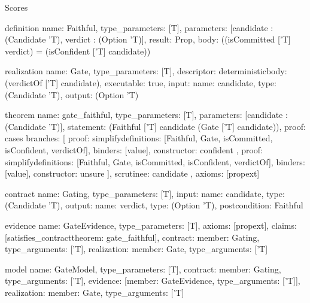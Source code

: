 \begin{lexlean}{Scores}
\begin{semanticmodule}
definition{
  name: Faithful,
  type_parameters: [T],
  parameters: [candidate : (Candidate 'T), verdict : (Option 'T)],
  result: Prop,
  body: ((isCommitted ['T] verdict) = (isConfident ['T] candidate))
}

realization{
  name: Gate,
  type_parameters: [T],
  descriptor: deterministic{body: (verdictOf ['T] candidate)},
  executable: true,
  input: {name: candidate, type: (Candidate 'T)},
  output: (Option 'T)
}

theorem{
  name: gate_faithful,
  type_parameters: [T],
  parameters: [candidate : (Candidate 'T)],
  statement: (Faithful ['T] candidate (Gate ['T] candidate)),
  proof: cases{
    branches: [
      {
        proof: simplify{definitions: [Faithful, Gate, isCommitted, isConfident, verdictOf]},
        binders: [value],
        constructor: confident
      },
      {
        proof: simplify{definitions: [Faithful, Gate, isCommitted, isConfident, verdictOf]},
        binders: [value],
        constructor: unsure
      }
    ],
    scrutinee: candidate
  },
  axioms: [propext]
}

contract{
  name: Gating,
  type_parameters: [T],
  input: {name: candidate, type: (Candidate 'T)},
  output: {name: verdict, type: (Option 'T)},
  postcondition: Faithful
}

evidence{
  name: GateEvidence,
  type_parameters: [T],
  axioms: [propext],
  claims: [satisfies_contract{theorem: gate_faithful}],
  contract: {member: Gating, type_arguments: ['T]},
  realization: {member: Gate, type_arguments: ['T]}
}

model{
  name: GateModel,
  type_parameters: [T],
  contract: {member: Gating, type_arguments: ['T]},
  evidence: [{member: GateEvidence, type_arguments: ['T]}],
  realization: {member: Gate, type_arguments: ['T]}
}
\end{semanticmodule}
\end{lexlean}
